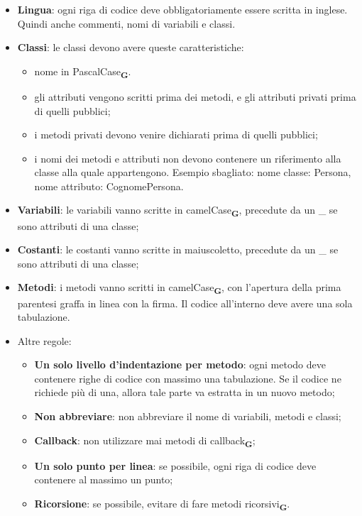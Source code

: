 \begin{itemize}
    \item \textbf{Lingua}: ogni riga di codice deve obbligatoriamente essere scritta in inglese. Quindi anche commenti, nomi di variabili e classi.
    \item \textbf{Classi}: le classi devono avere queste caratteristiche:
          \begin{itemize}
              \item nome in PascalCase\textsubscript{\textbf{G}}.
              \item gli attributi vengono scritti prima dei metodi, e gli attributi privati prima di quelli pubblici;
              \item i metodi privati devono venire dichiarati prima di quelli pubblici;
              \item i nomi dei metodi e attributi non devono contenere un riferimento alla classe alla quale appartengono. Esempio sbagliato: nome classe: Persona, nome attributo: CognomePersona.
          \end{itemize}
    \item \textbf{Variabili}: le variabili vanno scritte in camelCase\textsubscript{\textbf{G}}, precedute da un \_ se sono attributi di una classe;
    \item \textbf{Costanti}: le costanti vanno scritte in maiuscoletto, precedute da un \_ se sono attributi di una classe;
    \item \textbf{Metodi}: i metodi vanno scritti in camelCase\textsubscript{\textbf{G}}, con l'apertura della prima parentesi graffa in linea con la firma. Il codice all'interno deve avere una sola tabulazione.
    \item Altre regole:
          \begin{itemize}
              \item \textbf{Un solo livello d'indentazione per metodo}: ogni metodo deve contenere righe di codice con massimo una tabulazione. Se il codice ne richiede più di una, allora tale parte va estratta in un nuovo metodo;
              \item \textbf{Non abbreviare}: non abbreviare il nome di variabili, metodi e classi;
              \item \textbf{Callback}: non utilizzare mai metodi di callback\textsubscript{\textbf{G}};
              \item \textbf{Un solo punto per linea}: se possibile, ogni riga di codice deve contenere al massimo un punto;
              \item \textbf{Ricorsione}: se possibile, evitare di fare metodi ricorsivi\textsubscript{\textbf{G}}.
          \end{itemize}
\end{itemize}
